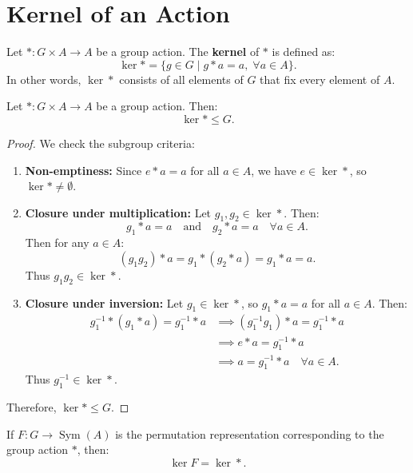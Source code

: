 \section{Kernel of an Action}

\begin{definition}
Let $* : G \times A \to A$ be a group action. The \textbf{kernel} of $*$ is defined as:
\[
\ker * = \{g \in G \mid g * a = a, \; \forall a \in A\}.
\]
In other words, $\ker *$ consists of all elements of $G$ that fix every element of $A$.
\end{definition}

\begin{theorem}
Let $* : G \times A \to A$ be a group action. Then:
\[
\ker * \le G.
\]
\end{theorem}

\begin{proof}
We check the subgroup criteria:
\begin{enumerate}[label=(\roman*)]
    \item \textbf{Non-emptiness:} Since $e * a = a$ for all $a \in A$, we have $e \in \ker *$, so $\ker * \neq \emptyset$.
    
    \item \textbf{Closure under multiplication:} Let $g_1, g_2 \in \ker *$. Then:
    \[
    g_1 * a = a \quad \text{and} \quad g_2 * a = a \quad \forall a \in A.
    \]
    Then for any $a \in A$:
    \[
    (g_1 g_2) * a = g_1 * (g_2 * a) = g_1 * a = a.
    \]
    Thus $g_1 g_2 \in \ker *$.
    
    \item \textbf{Closure under inversion:} Let $g_1 \in \ker *$, so $g_1 * a = a$ for all $a \in A$. Then:
    \begin{align*}
    g_1^{-1} * (g_1 * a) = g_1^{-1} * a &\implies (g_1^{-1} g_1) * a = g_1^{-1} * a \\
    &\implies e * a = g_1^{-1} * a \\
    &\implies a = g_1^{-1} * a \quad \forall a \in A.
    \end{align*}
    Thus $g_1^{-1} \in \ker *$.
\end{enumerate}
Therefore, $\ker * \le G$.
\end{proof}

\begin{theorem}
If $F : G \to \operatorname{Sym}(A)$ is the permutation representation corresponding to the group action $*$, then:
\[
\ker F = \ker *.
\]
\end{theorem}

